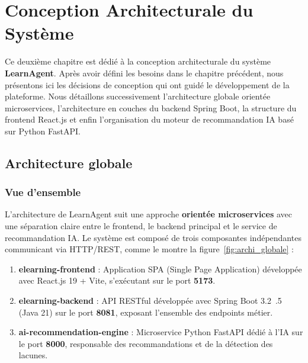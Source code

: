 \documentclass[12pt,a4paper]{report}
\begin{document}
\newpage

\chapter{Conception Architecturale du Système}

Ce deuxième chapitre est dédié à la conception architecturale du système \textbf{LearnAgent}. Après avoir défini les besoins dans le chapitre précédent, nous présentons ici les décisions de conception qui ont guidé le développement de la plateforme. Nous détaillons successivement l'architecture globale orientée microservices, l'architecture en couches du backend Spring Boot, la structure du frontend React.js et enfin l'organisation du moteur de recommandation IA basé sur Python FastAPI.

\section{Architecture globale}

\subsection{Vue d'ensemble}

L'architecture de LearnAgent suit une approche \textbf{orientée microservices} avec une séparation claire entre le frontend, le backend principal et le service de recommandation IA. Le système est composé de trois composantes indépendantes communicant via HTTP/REST, comme le montre la figure~\ref{fig:archi_globale} :

\begin{enumerate}
  \item \textbf{elearning-frontend} : Application SPA (Single Page Application) développée avec React.js 19 + Vite, s'exécutant sur le port \textbf{5173}.
  \item \textbf{elearning-backend} : API RESTful développée avec Spring Boot 3.2~\cite{spring}.5 (Java 21) sur le port \textbf{8081}, exposant l'ensemble des endpoints métier.
  \item \textbf{ai-recommendation-engine} : Microservice Python FastAPI dédié à l'IA sur le port \textbf{8000}, responsable des recommandations et de la détection des lacunes.
\end{enumerate}
\end{document}
